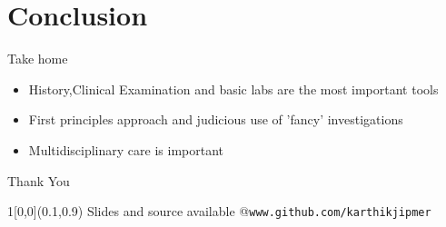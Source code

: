 \documentclass[compress]{beamer}
\makeatletter
\newcommand{\at}{\makeatletter @\makeatother}
\makeatother
\begin{document}
\section{Conclusion}
\begin{frame}{  }
	\begin{block}{Take home}
		\begin{itemize}
			\item History,Clinical Examination and basic labs are the most important tools
			\item First principles approach and judicious use of 'fancy' investigations
			\item Multidisciplinary care is important
		\end{itemize}
	\end{block}
\end{frame} 
\begin{frame}{ }
	\begin{center}
		\Huge {Thank You\emojismile}
	\end{center} 
\begin{textblock}{1}[0,0](0.1,0.9) 
	 \scriptsize Slides and source available \at \texttt{www.github.com/karthikjipmer}
\end{textblock}
\end{frame} 
\end{document}
